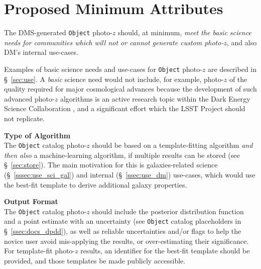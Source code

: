 \documentclass[DM,lsstdraft,toc]{lsstdoc}
\begin{document}
%
%


\clearpage
\section{Proposed Minimum Attributes}\label{sec:mvp}

The DMS-generated {\tt Object} photo-$z$ should, at minimum, {\it meet the basic science needs for communities which will not or cannot generate custom photo-$z$}, and also DM's internal use-cases.

Examples of basic science needs and use-cases for {\tt Object} photo-$z$ are described in \S~\ref{sec:use}.
A {\it basic} science need would not include, for example, photo-$z$ of the quality required for major cosmological advances because the development of such advanced photo-$z$ algorithms is an active research topic within the Dark Energy Science Collaboration \cite{2018arXiv180901669T}, and a significant effort which the LSST Project should not replicate. 


{\bf Type of Algorithm}\\
The {\tt Object} catalog photo-$z$ should be based on a template-fitting algorithm {\it and then also} a machine-learning algorithm, if multiple results can be stored (see \S~\ref{sec:store}).
The main motivation for this is galaxies-related science (\S~\ref{sssec:use_sci_gal}) and internal (\S~\ref{ssec:use_dm}) use-cases, which would use the best-fit template to derive additional galaxy properties.

{\bf Output Format}\\
The {\tt Object} catalog photo-$z$ should include the posterior distribution function and a point estimate with an uncertainty (see {\tt Object} catalog placeholders in \S~\ref{ssec:docs_dpdd}), as well as reliable uncertainties and/or flags to help the novice user avoid mis-applying the results, or over-estimating their significance.
For template-fit photo-$z$ results, an identifier for the best-fit template should be provided, and those templates be made publicly accessible.
\end{document}
